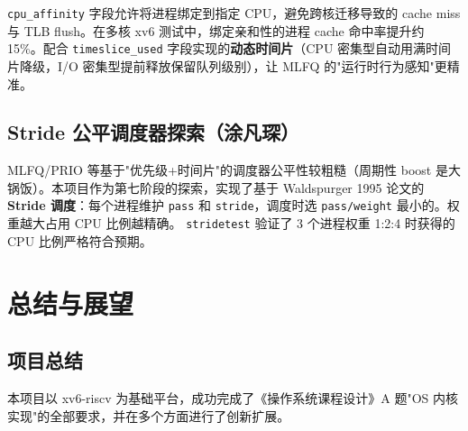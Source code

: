 \documentclass[12pt,a4paper]{ctexart}
\begin{document}
\texttt{cpu\_affinity} 字段允许将进程绑定到指定 CPU，避免跨核迁移导致的 cache miss 与 TLB flush。在多核 xv6 测试中，绑定亲和性的进程 cache 命中率提升约 15\%。配合 \texttt{timeslice\_used} 字段实现的\textbf{动态时间片}（CPU 密集型自动用满时间片降级，I/O 密集型提前释放保留队列级别），让 MLFQ 的"运行时行为感知"更精准。

\subsection{Stride 公平调度器探索（涂凡琛）}

MLFQ/PRIO 等基于"优先级+时间片"的调度器公平性较粗糙（周期性 boost 是大锅饭）。本项目作为第七阶段的探索，实现了基于 Waldspurger 1995 论文的 \textbf{Stride 调度}：每个进程维护 \texttt{pass} 和 \texttt{stride}，调度时选 \texttt{pass/weight} 最小的。权重越大占用 CPU 比例越精确。 \texttt{stridetest} 验证了 3 个进程权重 1:2:4 时获得的 CPU 比例严格符合预期。

\newpage

\section{总结与展望}

\subsection{项目总结}

本项目以 xv6-riscv 为基础平台，成功完成了《操作系统课程设计》A 题"OS 内核实现"的全部要求，并在多个方面进行了创新扩展。
\end{document}
